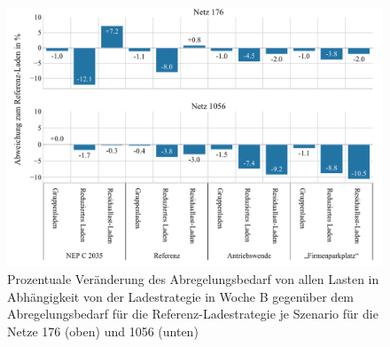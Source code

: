 \begin{figure}[H]
    \centering
    \includegraphics[width=\textwidth]{Bilder/176_1056_cur_load_grid_week_B}
    \caption{Prozentuale Veränderung des Abregelungsbedarf von allen Lasten in Abhängigkeit von der Ladestrategie in Woche B gegenüber dem Abregelungsbedarf für die Referenz-Ladestrategie je Szenario für die Netze \num{176} (oben) und \num{1056} (unten)}\label{fig:176_1056_cur_load_grid_week_B}
\end{figure}